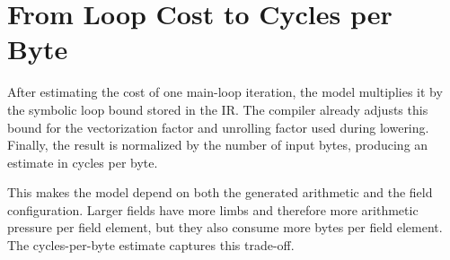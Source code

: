 \section{From Loop Cost to Cycles per Byte}
\label{sec:model-cycles-per-byte}

After estimating the cost of one main-loop iteration, the model multiplies it by the symbolic loop bound stored in the IR. The compiler already adjusts this bound for the vectorization factor and unrolling factor used during lowering. Finally, the result is normalized by the number of input bytes, producing an estimate in cycles per byte.

This makes the model depend on both the generated arithmetic and the field configuration. Larger fields have more limbs and therefore more arithmetic pressure per field element, but they also consume more bytes per field element. The cycles-per-byte estimate captures this trade-off.
